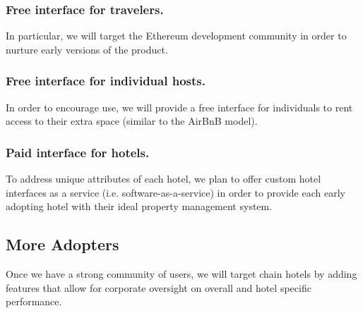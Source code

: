 \documentclass{article}
\begin{document}
\subsubsection{Free interface for travelers.} 
In particular, we will target the Ethereum development community in order to nurture early versions of the product.

\subsubsection{Free interface for individual hosts.}
In order to encourage use, we will provide a free interface for individuals to rent access to their extra space (similar to the AirBnB model). 

\subsubsection{Paid interface for hotels.}
To address unique attributes of each hotel, we plan to offer custom hotel interfaces as a service (i.e. software-as-a-service) in order to provide each early adopting hotel with their ideal property management system. 

\subsection{More Adopters}
Once we have a strong community of users, we will target chain hotels by adding features that allow for corporate oversight on overall and hotel specific performance.
\end{document}
